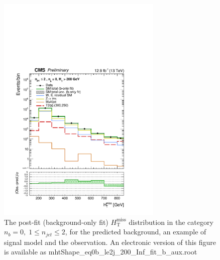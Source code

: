 \clearpage
\begin{figure}[tbhp]
    \caption{ 
    The post-fit (background-only fit) $H_{\mathrm{T}}^{\mathrm{miss}}$ distribution in the category $n_{b}=0, \; 1 \leq n_{jet} \leq 2$, 
    for the predicted background, an example of signal model and the observation.
    An electronic version of this figure is available as mhtShape\_eq0b\_le2j\_200\_Inf\_fit\_b\_aux.root
    \label{fig:mhtShape_eq0b_le2j_fit_b} }
  \begin{center}
  \includegraphics[width=0.7\textwidth]{mhtShape_eq0b_le2j_200_Inf_fit_b_aux}
  \end{center}
\end{figure}



